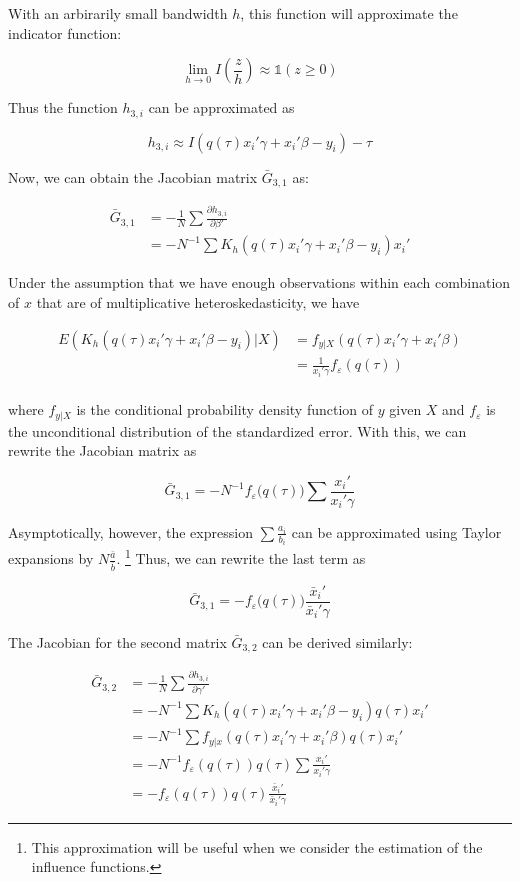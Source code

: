 \documentclass[
  authoryear,
  review,
  1p]{elsarticle}
\begin{document}
With an arbirarily small bandwidth \(h\), this function will approximate
the indicator function:

\[
\lim_{h\rightarrow 0} I\left(\frac{z}{h}\right) \approx \mathbb{1}(z\geq 0)
\]

Thus the function \(h_{3,i}\) can be approximated as

\[h_{3,i} \approx I\left( q(\tau) x_i'\gamma +x_i'\beta - y_i  \right) - \tau\]

Now, we can obtain the Jacobian matrix \(\bar G_{3,1}\) as:

\[\begin{aligned}
\bar G_{3,1} &= -\frac{1}{N} \sum \frac{\partial h_{3,i}}{\partial \beta'} \\
             &= -N^{-1} \sum K_h(q(\tau) x_i'\gamma +x_i'\beta - y_i ) x_i'
\end{aligned}
\]

Under the assumption that we have enough observations within each
combination of \(x\) that are of multiplicative heteroskedasticity, we
have

\[\begin{aligned}
E(K_h(q(\tau) x_i'\gamma +x_i'\beta - y_i )|X) &= f_{y|X}(q(\tau) x_i'\gamma +x_i'\beta) \\
&=\frac{1}{x_i'\gamma} f_{\varepsilon}(q(\tau)) \\
\end{aligned}
\]

where \(f_{y|X}\) is the conditional probability density function of
\(y\) given \(X\) and \(f_\varepsilon\) is the unconditional
distribution of the standardized error. With this, we can rewrite the
Jacobian matrix as

\[\bar G_{3,1} = -N^{-1} f_{\varepsilon}\big(q(\tau)\big) \sum  \frac{x_i'}{x_i'\gamma} 
\]

Asymptotically, however, the expression \(\sum\frac{a_i}{b_i}\) can be
approximated using Taylor expansions by \(N\frac{\bar a}{\bar b}\).
\footnote{This approximation will be useful when we consider the
  estimation of the influence functions.} Thus, we can rewrite the last
term as

\[\bar G_{3,1} = - f_{\varepsilon}\big(q(\tau)) \frac{\bar x_i'}{\bar x_i'\gamma} 
\]

The Jacobian for the second matrix \(\bar G_{3,2}\) can be derived
similarly:

\[\begin{aligned}
\bar G_{3,2} &= -\frac{1}{N} \sum \frac{\partial h_{3,i}}{\partial \gamma'} \\
             &= -N^{-1} \sum K_h(q(\tau) x_i'\gamma +x_i'\beta - y_i ) q(\tau) x_i' \\
             &=-N^{-1} \sum f_{y|x}(q(\tau) x_i'\gamma +x_i'\beta ) q(\tau) x_i' \\
             &=-N^{-1} f_{\varepsilon}(q(\tau)) q(\tau) \sum \frac{x_i'}{x_i'\gamma} \\
             &=- f_{\varepsilon}(q(\tau)) q(\tau) \frac{\bar x_i'}{\bar x_i'\gamma}
\end{aligned}
\]
\end{document}
